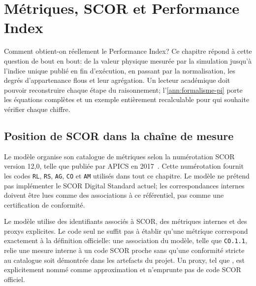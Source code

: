 \chapter{Métriques, SCOR et Performance Index}
\label{chap:scor-pi}

Comment obtient-on réellement le Performance Index? Ce chapitre répond à cette question de bout en bout: de la valeur physique mesurée par la simulation jusqu'à l'indice unique publié en fin d'exécution, en passant par la normalisation, les degrés d'appartenance flous et leur agrégation. Un lecteur académique doit pouvoir reconstruire chaque étape du raisonnement; l'\cref{ann:formalisme-pi} porte les équations complètes et un exemple entièrement recalculable pour qui souhaite vérifier chaque chiffre.


\section{Position de SCOR dans la chaîne de mesure}

Le modèle organise son catalogue de métriques selon la numérotation SCOR version 12,0, telle que publiée par APICS en 2017~\cite{apics2017}. Cette numérotation fournit les codes \texttt{RL}, \texttt{RS}, \texttt{AG}, \texttt{CO} et \texttt{AM} utilisés dans tout ce chapitre. Le modèle ne prétend pas implémenter le SCOR Digital Standard actuel; les correspondances internes doivent être lues comme des associations à ce référentiel, pas comme une certification de conformité.

Le modèle utilise des identifiants associés à SCOR, des métriques internes et des proxys explicites. Le code seul ne suffit pas à établir qu'une métrique correspond exactement à la définition officielle: une association du modèle, telle que \texttt{CO.1.1}, relie une mesure interne à un code SCOR proche sans qu'une conformité stricte au catalogue soit démontrée dans les artefacts du projet. Un proxy, tel que , est explicitement nommé comme approximation et n'emprunte pas de code SCOR officiel.


